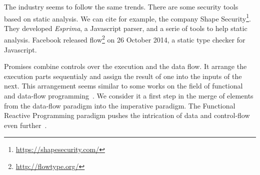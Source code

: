 The industry seems to follow the same trends.
There are some security tools based on static analysis.
We can cite for example, the company Shape Security\footnote{\url{https://shapesecurity.com/}}.
They developed \textit{Esprima}, a Javascript parser, and a serie of tools to help static analysis.
Facebook released flow\footnote{\url{http://flowtype.org/}} on 26 October 2014, a static type checker for Javascript.

Promises combine controls over the execution and the data flow.
It arrange the execution parts sequentialy and assign the result of one into the inputs of the next.
This arrangement seems similar to some works on the field of functional and data-flow programming~\cite{Johnston2004,Cohen2012,Morrison1994,Kahn1974}.
We consider it a first step in the merge of elements from the data-flow paradigm into the imperative paradigm.
The Functional Reactive Programming paradigm pushes the intrication of data and control-flow even further~\cite{Winograd-Cort2013}.

